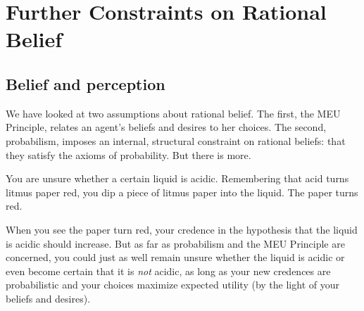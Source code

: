 \chapter{Further Constraints on Rational Belief}\label{ch:constraints}



\section{Belief and perception}

We have looked at two assumptions about rational belief. The first,
the MEU Principle, relates an agent's beliefs and desires to her
choices. The second, probabilism, imposes an internal, structural
constraint on rational beliefs: that they satisfy the axioms of
probability. But there is more.

\begin{example}\label{ex:litmus}
  You are unsure whether a certain liquid is acidic. Remembering that
  acid turns litmus paper red, you dip a piece of litmus paper into
  the liquid. The paper turns red.
\end{example}

When you see the paper turn red, your credence in the hypothesis that
the liquid is acidic should increase. But as far as probabilism and
the MEU Principle are concerned, you could just as well remain unsure
whether the liquid is acidic or even become certain that it is
\emph{not} acidic, as long as your new credences are probabilistic and
your choices maximize expected utility (by the light of your beliefs
and desires).

